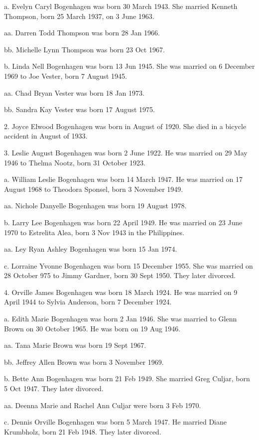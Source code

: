 \documentclass[a4paper]{article}
\begin{document}
a. Evelyn Caryl Bogenhagen was born 30 March 1943.  She married Kenneth Thompson, born 25 March 1937, on 3 June 1963.
 
aa. Darren Todd Thompson was born 28 Jan 1966.

bb. Michelle Lynn Thompson was born 23 Oct 1967.

b. Linda Nell Bogenhagen was born 13 Jun 1945.  She was married on 6 December 1969 to Joe Vester, born 7 August 1945.  
 
aa. Chad Bryan Vester was born 18 Jan 1973.

bb. Sandra Kay Vester was born 17 August 1975.

2. Joyce Elwood Bogenhagen was born in August of 1920.  She died in a bicycle accident in August of 1933.

3. Leslie August Bogenhagen was born 2 June 1922.  He was married on 29 May 1946 to Thelma Nootz, born 31 October 1923. 

a. William Leslie Bogenhagen was born 14 March 1947.  He was married on 17 August 1968 to Theodora Sponsel, born 3 November 1949.
 
aa. Nichole Danyelle Bogenhagen was born 19 August 1978.

b. Larry Lee Bogenhagen was born 22 April 1949.  He was married on 23 June 1970 to Estrelita Alea, born 3 Nov 1943 in the Philippines.

aa. Ley Ryan Ashley Bogenhagen was born 15 Jan 1974.

c. Lorraine Yvonne Bogenhagen was born 15 December 1955.  She was married on 28 October 975 to Jimmy Gardner, born 30 Sept 1950. They later divorced.
 
4. Orville James Bogenhagen was born 18 March 1924.  He was married on 9 April 1944 to Sylvia Anderson, born 7 December 1924.
 
a. Edith Marie Bogenhagen was born 2 Jan 1946.  She was married to Glenn Brown on 30 October 1965.  He was born on 19 Aug 1946.

aa. Tana Marie Brown was born 19 Sept 1967.

bb. Jeffrey Allen Brown was born 3 November 1969.

b. Bette Ann Bogenhagen was born  21 Feb 1949.  She married Greg Culjar, born 5 Oct 1947.  They later divorced.

aa. Deenna Marie and Rachel Ann Culjar were born 3 Feb 1970.

c. Dennis Orville Bogenhagen was born 5 March 1947.  He married Diane Krumbholz, born 21 Feb 1948.  They later divorced.
 
\end{document}
